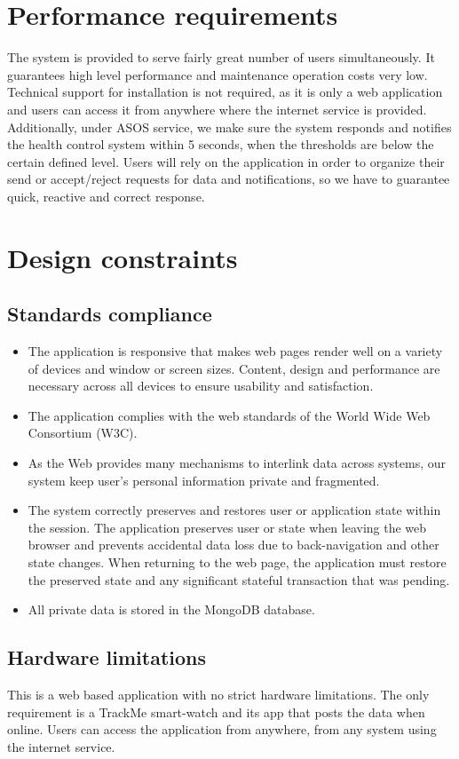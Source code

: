 \documentclass[12pt]{report}
\begin{document}
\section{Performance requirements}
The system is provided to serve fairly great number of users simultaneously. It guarantees high level performance and maintenance operation costs very low. Technical support for installation is not required, as it is only a web application and users can access it from anywhere where the internet service is provided. Additionally, under ASOS service, we make sure the system responds and notifies the health control system within 5 seconds, when the thresholds are below the certain defined level. Users will rely on the application in order to organize their send or accept/reject requests for data and notifications, so we have to guarantee quick, reactive and correct response.
\section{Design constraints}
\subsection{Standards compliance}
\begin{itemize}
\item{} The application is responsive that makes web pages render well on a variety of devices and window or screen sizes. Content, design and performance are necessary across all devices to ensure usability and satisfaction.
\item{} The application complies with the web standards of the World Wide Web Consortium (W3C).
\item{} As the Web provides many mechanisms to interlink data across systems, our system keep user's personal information private and fragmented.
\item{} The system correctly preserves and restores user or application state within the session. The application preserves user or state when leaving the web browser and prevents accidental data loss due to back-navigation and other state changes. When returning to the web page, the application must restore the preserved state and any significant stateful transaction that was pending.
\item{} All private data is stored in the MongoDB database.
\end{itemize}

\subsection{Hardware limitations}
This is a web based application with no strict hardware limitations. The only requirement is a TrackMe smart-watch and its app that posts the data when online. Users can access the application from anywhere, from any system using the internet service.
\end{document}
